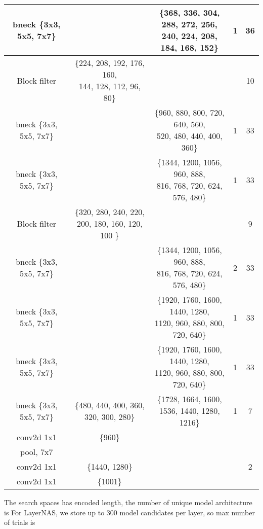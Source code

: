 \begin{table}
\begin{center}
\begin{tabular}[hp]{c|c|c|c|c}
  bneck \{3x3, 5x5, 7x7\} & &\shortstack{\{368, 336, 304, 288, 272, 256, \\ 240, 224, 208, 184, 168, 152\}} &1 &36\\
\hline
Block filter &\shortstack{\{224, 208, 192, 176, 160, \\ 144, 128, 112, 96, 80\}} & & &10 \\
  bneck \{3x3, 5x5, 7x7\} & &\shortstack{\{960, 880, 800, 720, 640, 560, \\ 520, 480, 440, 400, 360\}} &1 &33 \\
  bneck \{3x3, 5x5, 7x7\} & &\shortstack{\{1344, 1200, 1056, 960, 888, \\ 816, 768, 720, 624, 576, 480\}} &1 &33 \\
\hline

Block filter &\shortstack{\{320, 280, 240, 220, \\ 200, 180, 160, 120, 100 \}} & & &9 \\
  bneck \{3x3, 5x5, 7x7\} & &\shortstack{\{1344, 1200, 1056, 960, 888, \\ 816, 768, 720, 624, 576, 480\}} &2 &33 \\
  bneck \{3x3, 5x5, 7x7\} & &\shortstack{\{1920, 1760, 1600, 1440, 1280, \\ 1120, 960, 880, 800, 720, 640\}} &1  &33\\
  bneck \{3x3, 5x5, 7x7\} & &\shortstack{\{1920, 1760, 1600, 1440, 1280, \\ 1120, 960, 880, 800, 720, 640\}} &1 &33 \\
\hline
  bneck \{3x3, 5x5, 7x7\} &\{480, 440, 400, 360, 320, 300, 280\} &\shortstack{\{1728, 1664, 1600, \\ 1536, 1440, 1280, 1216\}} &1 &7\\
\hline
  conv2d 1x1 &\{960\} & & \\
  pool, 7x7  & & &\\
  conv2d 1x1  &\{1440, 1280\} & &  &2\\
  conv2d 1x1 &\{1001\} & & \\
\hline
\hline

\end{tabular}
\end{center}
\end{table}

The search spaces has  encoded length, the number of unique model architecture is 
For LayerNAS, we store up to 300 model candidates per layer, so max number of trials is 




